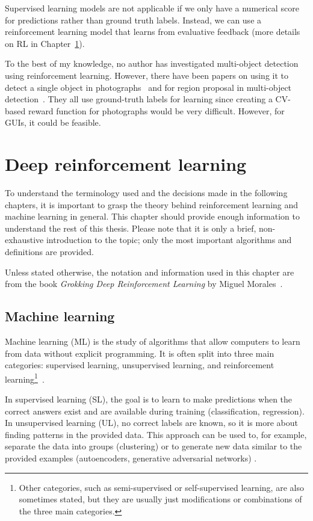 \documentclass[
  digital,     %
  oneside,     %
  nosansbold,  %
  nocolorbold, %
  lof,         %
  lot,         %
]{fithesis4}
\begin{document}
Supervised learning models are not applicable if we only have a numerical score for predictions rather than ground truth labels. Instead, we can use a reinforcement learning model that learns from evaluative feedback (more details on RL in Chapter~\ref{ch:dlr}).

To the best of my knowledge, no author has investigated multi-object detection using reinforcement learning. However, there have been papers on using it to detect a single object in photographs~\cite{iterative_od_with_rl, hierarchical_od_with_drl} and for region proposal in multi-object detection~\cite{drl_rpn}. They all use ground-truth labels for learning since creating a CV-based reward function for photographs would be very difficult. However, for GUIs, it could be feasible. 

\chapter{Deep reinforcement learning}
\label{ch:dlr}

To understand the terminology used and the decisions made in the following chapters, it is important to grasp the theory behind reinforcement learning and machine learning in general. This chapter should provide enough information to understand the rest of this thesis. Please note that it is only a brief, non-exhaustive introduction to the topic; only the most important algorithms and definitions are provided.

Unless stated otherwise, the notation and information used in this chapter are from the book \textit{Grokking Deep Reinforcement Learning} by Miguel Morales~\cite{GDRL}.

\section{Machine learning}
Machine learning (ML) is the study of algorithms that allow computers to learn from data without explicit programming. It is often split into three main categories: supervised learning, unsupervised learning, and reinforcement learning\footnote{Other categories, such as semi-supervised or self-supervised learning, are also sometimes stated, but they are usually just modifications or combinations of the three main categories.}~\cite{IB031}.

In supervised learning (SL), the goal is to learn to make predictions when the correct answers exist and are available during training (classification, regression). In unsupervised learning (UL), no correct labels are known, so it is more about finding patterns in the provided data. This approach can be used to, for example, separate the data into groups (clustering) or to generate new data similar to the provided examples (autoencoders, generative adversarial networks) \cite{IB031, PV021}.
\end{document}

